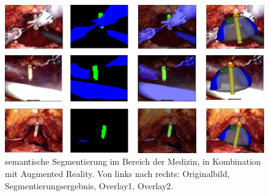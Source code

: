\begin{figure}[H]
    \centering
    \includegraphics[width=1\textwidth]{bilder/medizin_AR.jpg}
    \captionsetup{font=small} %

    \caption[semantische Segmentierung im Bereich der Medizin, in Kombination mit Augmented Reality] {semantische Segmentierung im Bereich der Medizin, in Kombination mit Augmented Reality. Von links nach rechts: Originalbild, Segmentierungsergebnis, Overlay1, Overlay2.  \cite{tanzi2021real}}
    \label{fig:SS_medizin}
\end{figure}